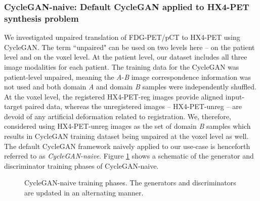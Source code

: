 \subsubsection{CycleGAN-naive: Default CycleGAN applied to HX4-PET synthesis problem}

We investigated unpaired translation of FDG-PET/pCT to HX4-PET using CycleGAN. The term ``unpaired" can be used on two levels here -- on the patient level and on the voxel level. At the patient level, our dataset includes all three image modalities for each patient. The training data for the CycleGAN was patient-level unpaired, meaning the \textit{A}-\textit{B} image correspondence information was not used and both domain \textit{A} and domain \textit{B} samples were independently shuffled. At the voxel level, the registered HX4-PET-reg images provide aligned input-target paired data, whereas the unregistered images -- HX4-PET-unreg -- are devoid of any artificial deformation related to registration. We, therefore, considered using HX4-PET-unreg images as the set of domain \textit{B} samples which results in CycleGAN training dataset being unpaired at the voxel level as well. The default CycleGAN framework naively applied to our use-case is henceforth referred to as \textit{CycleGAN-naive}. Figure \ref{fig:cyclegan_naive} shows a schematic of the generator and discriminator training phases of CycleGAN-naive. 

\begin{figure}[h!]
    \centering
    \caption{CycleGAN-naive training phases. The generators and discriminators are updated in an alternating manner.}
    \label{fig:cyclegan_naive}
\end{figure}{}

